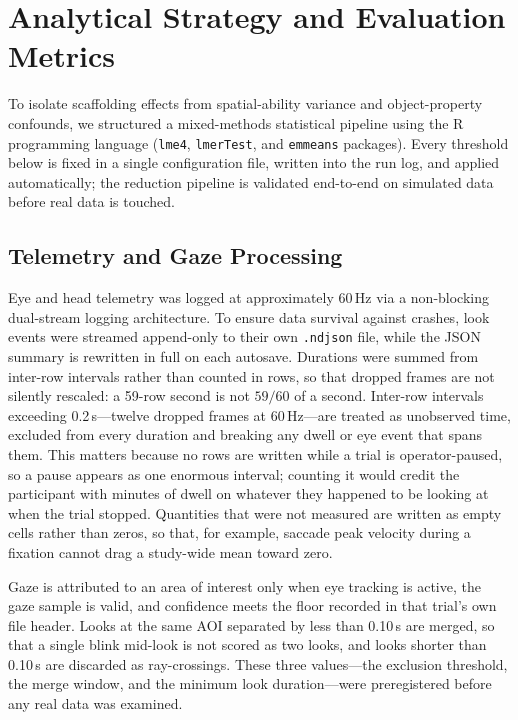 \section{Analytical Strategy and Evaluation Metrics}

To isolate scaffolding effects from spatial-ability variance and
object-property confounds, we structured a mixed-methods statistical pipeline
using the R programming language (\texttt{lme4}, \texttt{lmerTest}, and
\texttt{emmeans} packages). Every threshold below is fixed in a single
configuration file, written into the run log, and applied automatically; the
reduction pipeline is validated end-to-end on simulated data before real data
is touched.

\subsection{Telemetry and Gaze Processing}

Eye and head telemetry was logged at approximately 60\,Hz via a non-blocking
dual-stream logging architecture. To ensure data survival against crashes,
look events were streamed append-only to their own \texttt{.ndjson} file,
while the JSON summary is rewritten in full on each autosave. Durations were
summed from inter-row intervals rather than counted in rows, so that dropped
frames are not silently rescaled: a 59-row second is not $59/60$ of a second.
Inter-row intervals exceeding 0.2\,s---twelve dropped frames at 60\,Hz---are
treated as unobserved time, excluded from every duration and breaking any
dwell or eye event that spans them. This matters because no rows are written
while a trial is operator-paused, so a pause appears as one enormous interval;
counting it would credit the participant with minutes of dwell on whatever
they happened to be looking at when the trial stopped. Quantities that were
not measured are written as empty cells rather than zeros, so that, for
example, saccade peak velocity during a fixation cannot drag a study-wide mean
toward zero.

Gaze is attributed to an area of interest only when eye tracking is active,
the gaze sample is valid, and confidence meets the floor recorded in that
trial's own file header. Looks at the same AOI separated by less than 0.10\,s
are merged, so that a single blink mid-look is not scored as two looks, and
looks shorter than 0.10\,s are discarded as ray-crossings. These three
values---the exclusion threshold, the merge window, and the minimum look
duration---were preregistered before any real data was examined.

